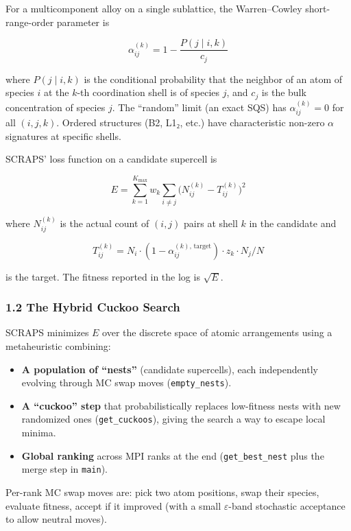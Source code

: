 \documentclass[
  11pt,
]{article}
\providecommand{\tightlist}{%
  \setlength{\itemsep}{0pt}\setlength{\parskip}{0pt}}
\begin{document}
For a multicomponent alloy on a single sublattice, the Warren--Cowley
short-range-order parameter is

\[\alpha_{ij}^{(k)} = 1 - \frac{P(j \mid i, k)}{c_j}\]

where \(P(j \mid i, k)\) is the conditional probability that the
neighbor of an atom of species \(i\) at the \(k\)-th coordination shell
is of species \(j\), and \(c_j\) is the bulk concentration of species
\(j\). The ``random'' limit (an exact SQS) has \(\alpha_{ij}^{(k)} = 0\)
for all \((i, j, k)\). Ordered structures (B2, L1₂, etc.) have
characteristic non-zero \(\alpha\) signatures at specific shells.

SCRAPS' loss function on a candidate supercell is

\[E = \sum_{k=1}^{K_\mathrm{max}} w_k \sum_{i \neq j} \big( N_{ij}^{(k)} - T_{ij}^{(k)} \big)^2\]

where \(N_{ij}^{(k)}\) is the actual count of \((i, j)\) pairs at shell
\(k\) in the candidate and

\[T_{ij}^{(k)} = N_i \cdot (1 - \alpha_{ij}^{(k),\,\mathrm{target}}) \cdot z_k \cdot N_j / N\]

is the target. The fitness reported in the log is \(\sqrt{E}\).

\subsubsection{1.2 The Hybrid Cuckoo
Search}\label{the-hybrid-cuckoo-search}

SCRAPS minimizes \(E\) over the discrete space of atomic arrangements
using a metaheuristic combining:

\begin{itemize}
\tightlist
\item
  \textbf{A population of ``nests''} (candidate supercells), each
  independently evolving through MC swap moves (\texttt{empty\_nests}).
\item
  \textbf{A ``cuckoo'' step} that probabilistically replaces low-fitness
  nests with new randomized ones (\texttt{get\_cuckoos}), giving the
  search a way to escape local minima.
\item
  \textbf{Global ranking} across MPI ranks at the end
  (\texttt{get\_best\_nest} plus the merge step in \texttt{main}).
\end{itemize}

Per-rank MC swap moves are: pick two atom positions, swap their species,
evaluate fitness, accept if it improved (with a small
\(\varepsilon\)-band stochastic acceptance to allow neutral moves).
\end{document}
